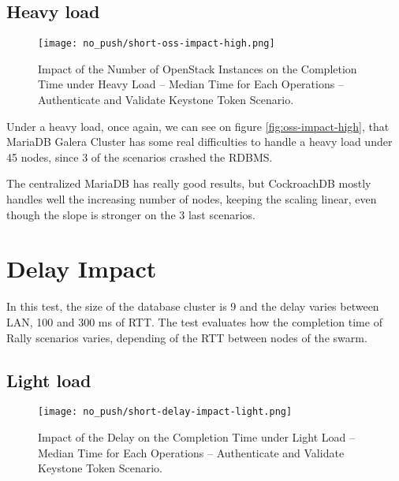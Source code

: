 \subsection{Heavy load}

\begin{figure}[H]
  \vspace{-10pt}
  \centering
  \centerline{\texttt{[image: no\_push/short-oss-impact-high.png]}}
  \vspace{-5pt}
  \caption{Impact of the Number of OpenStack Instances on the Completion Time under Heavy Load – Median Time for Each Operations – Authenticate and Validate Keystone Token Scenario.}
  \vspace{-5pt}
  \label{fig:short-oss-impact-high}
\end{figure}

Under a heavy load, once again, we can see on figure \ref{fig:oss-impact-high}, that MariaDB Galera Cluster has some real difficulties to handle a heavy load under 45 nodes, since 3 of the scenarios crashed the RDBMS.

The centralized MariaDB has really good results, but CockroachDB mostly handles well the increasing number of nodes, keeping the scaling linear, even though the slope is stronger on the 3 last scenarios.


\section{Delay Impact}

In this test, the size of the database cluster is 9 and the delay varies between LAN, 100 and 300 ms of RTT. The test evaluates how the completion time of Rally scenarios varies, depending of the RTT between nodes of the swarm.



\subsection{Light load}

\begin{figure}[H]
  \vspace{-10pt}
  \centering
  \centerline{\texttt{[image: no\_push/short-delay-impact-light.png]}}
  \vspace{-5pt}
  \caption{Impact of the Delay on the Completion Time under Light Load – Median Time for Each Operations – Authenticate and Validate Keystone Token Scenario.}
  \vspace{-5pt}
  \label{fig:short-delay-impact-light}
\end{figure}

